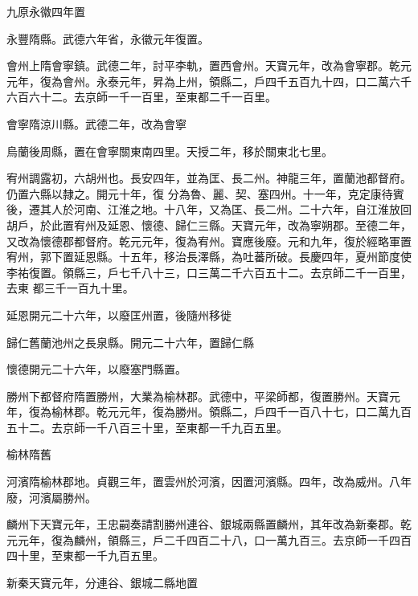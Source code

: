 \begin{pinyinscope}
 九原永徽四年置



 永豐隋縣。武德六年省，永徽元年復置。



 會州上隋會寧鎮。武德二年，討平李軌，置西會州。天寶元年，改為會寧郡。乾元元年，復為會州。永泰元年，昇為上州，領縣二，戶四千五百九十四，口二萬六千六百六十二。去京師一千一百里，至東都二千一百里。



 會寧隋涼川縣。武德二年，改為會寧



 烏蘭後周縣，置在會寧關東南四里。天授二年，移於關東北七里。



 宥州調露初，六胡州也。長安四年，並為匡、長二州。神龍三年，置蘭池都督府。仍置六縣以隸之。開元十年，復
 分為魯、麗、契、塞四州。十一年，克定康待賓後，遷其人於河南、江淮之地。十八年，又為匡、長二州。二十六年，自江淮放回胡戶，於此置宥州及延恩、懷德、歸仁三縣。天寶元年，改為寧朔郡。至德二年，又改為懷德郡都督府。乾元元年，復為宥州。寶應後廢。元和九年，復於經略軍置宥州，郭下置延恩縣。十五年，移治長澤縣，為吐蕃所破。長慶四年，夏州節度使李祐復置。領縣三，戶七千八十三，口三萬二千六百五十二。去京師二千一百里，去東
 都三千一百九十里。



 延恩開元二十六年，以廢匡州置，後隨州移徙



 歸仁舊蘭池州之長泉縣。開元二十六年，置歸仁縣



 懷德開元二十六年，以廢塞門縣置。



 勝州下都督府隋置勝州，大業為榆林郡。武德中，平梁師都，復置勝州。天寶元年，復為榆林郡。乾元元年，復為勝州。領縣二，戶四千一百八十七，口二萬九百五十二。去京師一千八百三十里，至東都一千九百五里。



 榆林隋舊



 河濱隋榆林郡地。貞觀三年，置雲州於河濱，因置河濱縣。四年，改為威州。八年廢，河濱屬勝州。



 麟州下天寶元年，王忠嗣奏請割勝州連谷、銀城兩縣置麟州，其年改為新秦郡。乾元元年，復為麟州，領縣三，戶二千四百二十八，口一萬九百三。去京師一千四百四十里，至東都一千九百五里。



 新秦天寶元年，分連谷、銀城二縣地置




\end{pinyinscope}
